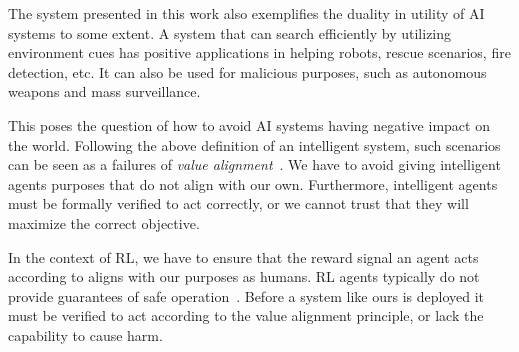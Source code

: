 The system presented in this work also exemplifies the duality in utility of AI systems to some extent.
A system that can search efficiently by utilizing environment cues has positive applications in helping robots, rescue scenarios, fire detection, etc.
It can also be used for malicious purposes, such as autonomous weapons and mass surveillance.

This poses the question of how to avoid AI systems having negative impact on the world.
Following the above definition of an intelligent system, such scenarios can be seen as a failures of \textit{value alignment}~\cite{russell_provably_2022}.
We have to avoid giving intelligent agents purposes that do not align with our own.
Furthermore, intelligent agents must be formally verified to act correctly, or we cannot trust that they will maximize the correct objective.

In the context of RL, we have to ensure that the reward signal an agent acts according to aligns with our purposes as humans.
RL agents typically do not provide guarantees of safe operation~\cite{fulton_safe_2018}.
Before a system like ours is deployed it must be verified to act according to the value alignment principle, or lack the capability to cause harm.

